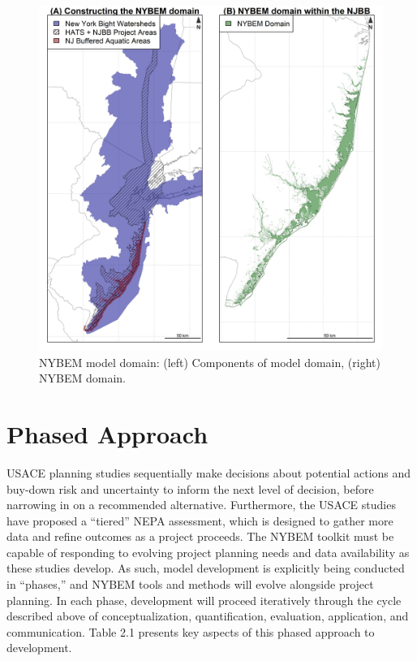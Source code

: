 \documentclass[
]{book}
\begin{document}
\begin{figure}
\includegraphics[width=44.44in]{ZZ_Fig02.01_NYBEM.Extent} \caption{NYBEM model domain: (left) Components of model domain, (right) NYBEM domain.}\label{fig:unnamed-chunk-3}
\end{figure}

\hypertarget{phased-approach}{%
\section{Phased Approach}\label{phased-approach}}

USACE planning studies sequentially make decisions about potential actions and buy-down risk and uncertainty to inform the next level of decision, before narrowing in on a recommended alternative. Furthermore, the USACE studies have proposed a ``tiered'' NEPA assessment, which is designed to gather more data and refine outcomes as a project proceeds. The NYBEM toolkit must be capable of responding to evolving project planning needs and data availability as these studies develop. As such, model development is explicitly being conducted in ``phases,'' and NYBEM tools and methods will evolve alongside project planning. In each phase, development will proceed iteratively through the cycle described above of conceptualization, quantification, evaluation, application, and communication. Table 2.1 presents key aspects of this phased approach to development.
\end{document}
